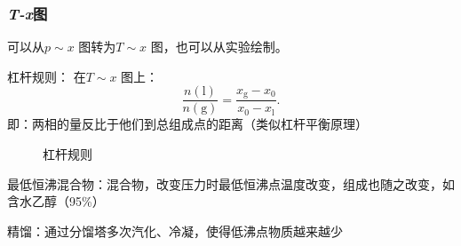\subsubsection{\textit{T-x}图}%
\label{subsub:-textit-T-x-图}
可以从$p\sim x$ 图转为$T\sim x$ 图，也可以从实验绘制。
\begin{notation}
    杠杆规则： 在$T\sim x$ 图上：\[
        \frac{n\left( \text{l} \right)}{n\left( \text{g} \right)} = \frac{x_\text{g} - x_0}{x_0-x_\text{l}}
    .\]
    即：两相的量反比于他们到总组成点的距离（类似杠杆平衡原理）
\begin{figure}[ht!]
    \centering
    \caption{杠杆规则}
    \label{fig:杠杆规则}
\end{figure}
\end{notation}
\begin{notation}
    最低恒沸混合物：混合物，改变压力时最低恒沸点温度改变，组成也随之改变，如含水乙醇（95\%）
\end{notation}
\begin{notation}
    精馏：通过分馏塔多次汽化、冷凝，使得低沸点物质越来越少
\end{notation}
